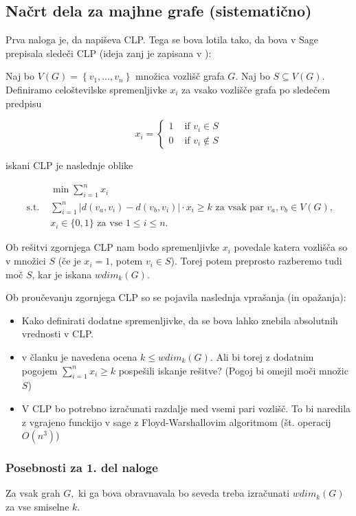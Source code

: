 \documentclass[a4paper,12pt]{article}
\begin{document}
\subsection{Načrt dela za majhne grafe (sistematično)}
Prva naloga je, da napiševa CLP. Tega se bova lotila tako, da bova v Sage prepisala sledeči CLP (ideja zanj je zapisana v \cite{peterin2023resolving}):

Naj bo $V(G)=\left\{v_{1}, \ldots, v_{n}\right\}$ množica vozlišč grafa $G$. Naj bo $S \subseteq V(G)$. Definiramo celoštevilske spremenljivke $x_{i}$ za vsako vozlišče grafa po sledečem predpisu 

$$
x_{i}= \begin{cases}1 & \text { if } v_{i} \in S \\ 0 & \text { if } v_{i} \notin S\end{cases}
$$

iskani CLP je naslednje oblike

$$
\begin{array}{ll} 
& \min \sum_{i=1}^{n} x_{i} \\
\text { s.t. } & \sum_{i=1}^{n}\left|d\left(v_{a}, v_{i}\right)-d\left(v_{b}, v_{i}\right)\right| \cdot x_{i} \geq k \text { za vsak par } v_{a}, v_{b} \in V(G), \\
& x_{i} \in\{0,1\} \text { za vse } 1 \leq i \leq n .
\end{array}
$$

Ob rešitvi zgornjega CLP nam bodo spremenljivke $x_{i}$ povedale katera vozlišča so v množici $S$ (če je $x_{i}=1$, potem $v_{i} \in S$). Torej potem preprosto razberemo tudi moč $S$, kar je iskana $wdim_k(G)$.

Ob proučevanju zgornjega CLP so se pojavila naslednja vprašanja (in opažanja):
\begin{itemize}
    \item Kako definirati dodatne spremenljivke, da se bova lahko znebila absolutnih vrednosti v CLP.
    \item v članku je navedena ocena $k \leq wdim_k(G).$ Ali bi torej z dodatnim pogojem  $\sum_{i=1}^{n} x_{i} \geq k$ pospešili iskanje rešitve? (Pogoj bi omejil moči množic $S$)
    \item V CLP bo potrebno izračunati razdalje med vsemi pari vozlišč. To bi naredila z vgrajeno funckijo v sage z Floyd-Warshallovim algoritmom (št. operacij $O(n^3)$)
\end{itemize}

\subsubsection{Posebnosti za 1. del naloge}
Za vsak grah $G,$ ki ga bova obravnavala bo seveda treba izračunati $wdim_k(G)$ za vse smiselne $k$.
\end{document}
